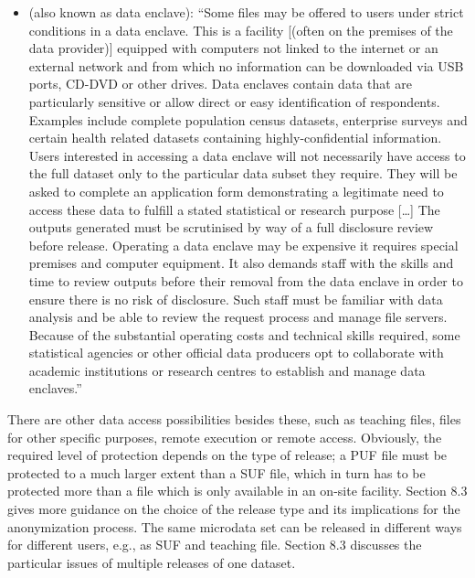 \documentclass[letterpaper,10pt,english]{sphinxmanual}
\begin{document}
\begin{itemize}
\item {} 
 (also
known as data enclave): “Some files may be offered to users under
strict conditions in a data enclave. This is a facility {[}(often on
the premises of the data provider){]} equipped with computers not
linked to the internet or an external network and from which no
information can be downloaded via USB ports, CD-DVD or other drives.
Data enclaves contain data that are particularly sensitive or allow
direct or easy identification of respondents. Examples include
complete population census datasets, enterprise surveys and certain
health related datasets containing highly-confidential information.
Users interested in accessing a data enclave will not necessarily
have access to the full dataset \textendash{} only to the particular data subset
they require. They will be asked to complete an application form
demonstrating a legitimate need to access these data to fulfill a
stated statistical or research purpose {[}…{]} The outputs generated must
be scrutinised by way of a full disclosure review before release.
Operating a data enclave may be expensive \textendash{} it requires special
premises and computer equipment. It also demands staff with the
skills and time to review outputs before their removal from the data
enclave in order to ensure there is no risk of disclosure. Such staff
must be familiar with data analysis and be able to review the request
process and manage file servers. Because of the substantial operating
costs and technical skills required, some statistical agencies or
other official data producers opt to collaborate with academic
institutions or research centres to establish and manage data
enclaves.”

\end{itemize}

There are other data access possibilities besides these, such as
teaching files, files for other specific purposes, remote execution or
remote access. Obviously, the required level of protection depends on
the type of release; a PUF file must be protected to a much larger
extent than a SUF file, which in turn has to be protected more than a
file which is only available in an on-site facility. Section 8.3 gives
more guidance on the choice of the release type and its implications for
the anonymization process. The same microdata set can be released in
different ways for different users, e.g., as SUF and teaching file.
Section 8.3 discusses the particular issues of multiple releases of one
dataset.
\end{document}
